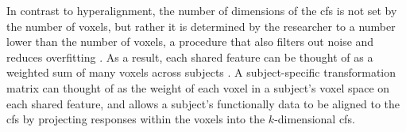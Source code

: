 In contrast to hyperalignment, the number of dimensions of the \ac{cfs} is not
set by the number of voxels, but rather it is determined by the researcher to a
number lower than the number of voxels, a procedure that also filters out noise
and reduces overfitting \citep{chen2015reduced}.
As a result, each shared feature can be thought of as a weighted sum of many
voxels across subjects \citep{kumar2020brainiak}.
A subject-specific transformation matrix can thought of as the weight of each
voxel in a subject's voxel space on each shared feature, and allows a subject's
functionally data to be aligned to the \ac{cfs} by projecting responses within
the voxels into the $k$-dimensional \ac{cfs}.




